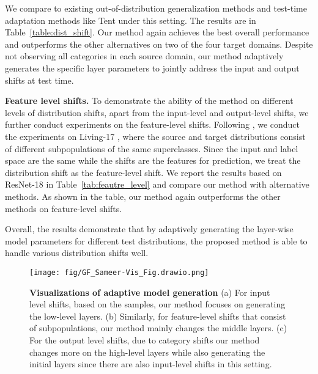 We compare to existing out-of-distribution generalization methods \cite{zhou2021mixstyle, zhang2022exact} and test-time adaptation methods like Tent under this setting. The results are in Table~\ref{table:dist_shift}.
Our method again achieves the best overall performance and outperforms the other alternatives on two of the four target domains.
Despite not observing all categories in each source domain, our method adaptively generates the specific layer parameters to jointly address the input and output shifts at test time. 


\noindent
\textbf{Feature level shifts.}
To demonstrate the ability of the method on different levels of distribution shifts, apart from the input-level and output-level shifts, we further conduct experiments on the feature-level shifts.
Following \cite{garg2023rlsbench}, we conduct the experiments on Living-17 \cite{santurkar2020breeds}, where the source and target distributions consist of different subpopulations of the same superclasses. 
Since the input and label space are the same while the shifts are the features for prediction, we treat the distribution shift as the feature-level shift.
We report the results based on ResNet-18 in Table~\ref{tab:feautre_level} and compare our method with alternative methods. As shown in the table, our method again outperforms the other methods on feature-level shifts.

Overall, %
the results demonstrate that by adaptively generating the layer-wise model parameters for different test distributions, the proposed method is able to handle various distribution shifts well.

\begin{figure*}[t]
\centering 
\centerline{   
    \texttt{[image: fig/GF\_Sameer-Vis\_Fig.drawio.png]}} 
    \vspace{-1em}
\caption{\textbf{Visualizations of adaptive model generation} (a) For input level shifts, based on the samples, our method focuses on generating the low-level layers. (b) Similarly, for feature-level shifts that consist of subpopulations, our method mainly changes the middle layers. (c) For the output level shifts, due to category shifts our method changes more on the high-level layers while also generating the initial layers since there are also input-level shifts in this setting. }
\vspace{-4mm}
\label{fig:visualization}  
\end{figure*}

